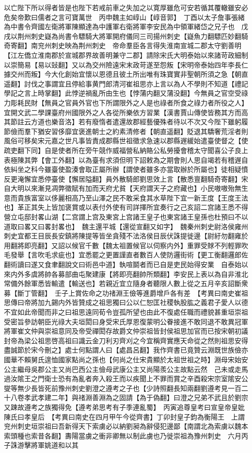 以亡陛下所以得者皆是也陛下若戒前車之失加之以寛厚雖危可安若循其覆轍雖安必危矣帝歎曰儒者之言可寶萬世　丙申魏主如崞山【崞音郭】　丁酉以太子詹事張緒為中書令齊國左衛將軍陳顯達為中護軍右衛將軍李安民為中領軍緒岱之兄子也　戊戌以荆州刺史嶷為尚書令驃騎大將軍開府儀同三司揚州刺史【嶷魚力翻驃匹妙翻騎奇寄翻】南兖州刺史映為荆州刺史　帝命羣臣各言得失淮南宣城二郡太守劉善明【江左僑立淮南郡於宣城郡界故善明兼守二郡】請除宋氏大明泰始以來諸苛政細制以崇簡易【易以䜴翻】又以為交州險遠宋末政苛遂至怨叛【宋明帝泰始四年李長仁據交州而叛】今大化創始宜懷以恩德且彼土所出唯有珠寶實非聖朝所須之急【朝直遥翻】討伐之事謂宜且停給事黄門郎清河崔祖思亦上言以為人不學則不知道【禮記學記之言上時掌翻】此悖逆禍亂所由生也【悖蒲内翻又蒲没翻】今無員之官空受祿力彫耗民財【無員之官員外官也下所謂限外之人是也祿者所食之祿力者所役之人】宜開文武二學課臺府州國限外之人各從所樂依方習業【漢書賈山傳使皆務其方而高其節註云方道也樂音洛】若有廢惰者遣還故郡經藝優殊者待以不次又今陛下雖躬履節儉而羣下猶安習侈靡宜褒進朝士之約素清修者【朝直遥翻】貶退其驕奢荒淫者則風俗可移矣宋元嘉之世凡事皆責成郡縣世祖徵求急速以郡縣遟緩始遣臺使督之【使疏吏翻下同】自是使者所在旁午競作威福營私納賂公私勞擾會稽太守聞喜公子良上表極陳其弊【會工外翻】以為臺有求須但明下詔敕為之期會則人思自竭若有稽遟自依糾坐之科今雖臺使盈湊會取正屬所辦【謂使者雖多亦當取辦於所屬也】徒相疑憤反更淹懈宜悉停臺使【懈居隘翻】員外散騎郎劉思效上言【散悉亶翻騎奇寄翻】宋自大明以來漸見凋弊徵賦有加而天府尤貧【天府謂天子之府藏也】小民嗷嗷殆無生意而貴族富室以侈麗相高乃至山澤之民不敢采食其水草陛下宜一新王度【王度王法也】革正其失上皆加褒賞或以表付外使有司詳擇所宜奏行之己亥詔二宫諸王悉不得營立屯邸封畧山湖【二宫謂上宫及東宮上宫諸王皇子也東宮諸王皇孫也杜預曰不以道取曰畧又曰畧封畧也】　魏主還平城【還從宣翻又如字】　魏秦州刺史尉洛侯雍州刺史宜都王目辰長安鎮將陳提等皆坐貪殘不法洛侯目辰伏誅提徙邊【尉紆勿翻雍於用翻將即亮翻】又詔以候官千數【魏太祖置候官以伺察内外】重罪受賕不列輕罪吹毛發舉【言吹毛求疵也】宜悉罷之更置謹直者數百人使防邏街術【更工衡翻邏郎佐翻術讀曰遂又食聿翻說文曰術邑中道】執喧鬬者而已自是吏民始得安業　自泰始以來内外多虞將帥各募部曲屯聚建康【將即亮翻帥所類翻】李安民上表以為自非淮北常備外餘軍悉皆輸遣【輸送也】若親近宜立隨身者聽限人數上從之五月辛亥詔斷衆募【斷丁管翻】　壬子上賞佐命之功禇淵王儉等進爵增戶各有差　【考異曰南史崔祖思傳曰帝將加九錫内外皆贊成之祖思獨曰公以仁恕匡社稷執股肱之義君子愛人以德不宜如此帝聞而非之曰祖思遠同荀令豈孤所望也由此不復處任職而禮貌甚重垣崇祖受密旨參訪朝臣光祿大夫垣閎曰身受宋氏厚恩復蒙明公眷接進不敢同退不敢異冠軍將軍崔文仲與崇祖意同及帝受禪閎存故爵文仲崇祖皆封侯祖思加官而已按宋朝初議封帝為梁公祖思啓高祖曰識云金刀利刃齊刈之今宜稱齊實應天命從之然則祖思安得盡誠節於宋今刪之】處士何點謂人曰【處昌呂翻】我作齊書已竟贊云淵既世族儉亦國華不賴舅氏遑恤國家點尚之孫也【何尚之仕宋貴顯於太祖世祖之時】淵母宋始安公主繼母吳郡公主又尚巴西公主儉母武康公主又尚陽羨公主故點云然　己未或走馬過汝隂王之門衛士恐有為亂者奔入殺王而以疾聞上不罪而賞之辛酉殺宋宗室隂安公燮等無少長皆死前豫州刺史劉澄之遵考之子也【少詩照翻長知兩翻劉遵考見一百二十八卷孝武孝建二年】與禇淵善淵為之固請【為于偽翻】曰澄之兄弟不武且於劉宗又踈故遵考之族獨得免【遵考弟思考有子季連亂蜀】　丙寅追尊皇考曰宣皇帝皇妣陳氏曰孝皇后　【考異曰南史在四月甲午今從齊書】丁卯封皇子鈞為衡陽王　上謂兖州刺史垣崇祖曰吾新得天下索虜必以納劉昶為辭侵犯邊鄙【南謂北為索虜以魏本索頭種也索昔各翻】夀陽當虜之衝非卿無以制此虜也乃徙崇祖為豫州刺史　六月丙子誅游擊將軍姚道和以其
